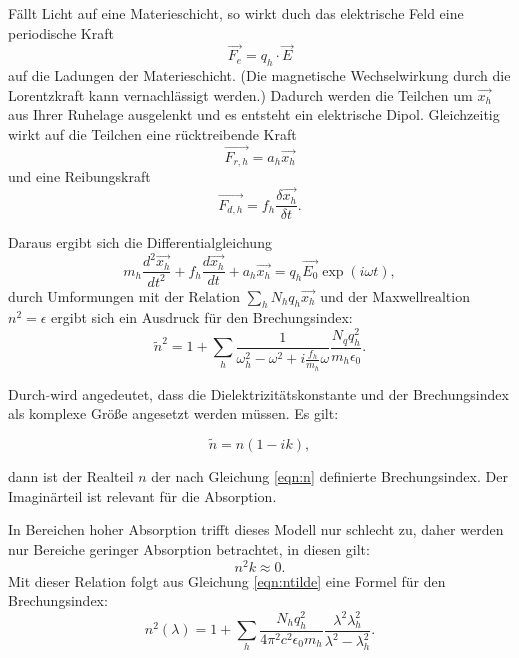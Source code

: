 Fällt Licht auf eine Materieschicht, so wirkt duch das elektrische Feld eine
periodische Kraft
\begin{equation}
  \vec{F_e}=q_h\cdot \vec{E}
\end{equation}
auf die Ladungen der Materieschicht. (Die magnetische Wechselwirkung durch
die Lorentzkraft kann vernachlässigt werden.)
Dadurch werden die Teilchen um $\vec{x_h}$ aus Ihrer Ruhelage ausgelenkt und es entsteht
ein elektrische Dipol.
Gleichzeitig wirkt auf die Teilchen eine rücktreibende Kraft
\begin{equation}
  \vec{F_{r,h}}=a_h \vec{x_h}
\end{equation}
und eine Reibungskraft
\begin{equation}
  \vec{F_{d,h}}=f_h \frac{\delta \vec{x_h}}{\delta t}.
\end{equation}

Daraus ergibt sich die Differentialgleichung
\begin{equation}
  m_h\frac{d^{2}\vec{x_h}}{dt^{2}}+f_h\frac{d\vec{x_h}}{dt}+a_h\vec{x_h}=q_h\vec{E_0}\exp{(i\omega t)},
\end{equation}
durch Umformungen mit der Relation $\sum_{h}{N_h q_h \vec{x_h}}$ und der
Maxwellrealtion $n^{2}=\epsilon$ ergibt sich
ein Ausdruck für den Brechungsindex:
\begin{equation}
  \tilde{n}^2=1+ \sum_{h} \frac{1}{\omega^{2}_h - \omega^{2}+i\frac{f_h}{m_h}\omega}
  \frac{N_q q^{2}_h}{m_h \epsilon_0}.
  \label{eqn:ntilde}
\end{equation}

Durch $\tilde{}$\;wird angedeutet, dass die Dielektrizitätskonstante und der
Brechungsindex als komplexe Größe angesetzt werden müssen. Es gilt:

\begin{equation}
  \tilde{n}= n(1-ik),
\end{equation}

dann ist der Realteil $n$ der nach Gleichung \ref{eqn:n} definierte Brechungsindex.
Der Imaginärteil ist relevant für die Absorption.

In Bereichen hoher Absorption trifft dieses Modell nur schlecht zu, daher
werden nur Bereiche geringer Absorption betrachtet, in diesen gilt:
\begin{equation}
  n^{2}k\approx 0.
\end{equation}
 Mit dieser Relation folgt aus Gleichung \ref{eqn:ntilde} eine Formel für den
 Brechungsindex:
 \begin{equation}
   n^{2}(\lambda)= 1+ \sum_{h}\frac{N_h q^{2}_h}{4\pi^{2}c^2 \epsilon_0 m_h}
   \frac{\lambda^2 \lambda^{2}_h}{\lambda^2 - \lambda^{2}_h}.
   \label{eqn:nquadrat}
 \end{equation}

